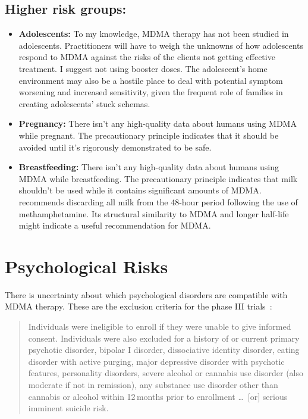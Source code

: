 \documentclass[11pt,oneside]{book}
\let\cite\parencite
\begin{document}
\subsection*{Higher risk groups:}
\begin{itemize}
    \item \textbf{Adolescents:} To my knowledge, MDMA therapy has not been studied in adolescents. Practitioners will have to weigh the unknowns of how adolescents respond to MDMA against the risks of the clients not getting effective treatment. I suggest not using booster doses. The adolescent's home environment may also be a hostile place to deal with potential symptom worsening and increased sensitivity, given the frequent role of families in creating adolescents' stuck schemas.
    \item \textbf{Pregnancy:} There isn't any high-quality data about humans using MDMA while pregnant. The precautionary principle indicates that it should be avoided until it's rigorously demonstrated to be safe.
    \item \textbf{Breastfeeding:} There isn't any high-quality data about humans using MDMA while breastfeeding. The precautionary principle indicates that milk shouldn't be used while it contains significant amounts of MDMA. \textcite{bartuLactation} recommends discarding all milk from the 48-hour period following the use of methamphetamine. Its structural similarity to MDMA and longer half-life might indicate a useful recommendation for MDMA.
\end{itemize}

\section{Psychological Risks}
\label{psychologicalRisks}
There is uncertainty about which psychological disorders are compatible with MDMA therapy. These are the exclusion criteria for the phase III trials~\cite[Supplementary Information; p. 5]{mitchellMDMAClinicalTrial2}:
\begin{quotation}
    Individuals were ineligible to enroll if they were unable to give informed consent. Individuals were also excluded for a history of or current primary psychotic disorder, bipolar I disorder, dissociative identity disorder, eating disorder with active purging, major depressive disorder with psychotic features, personality disorders, severe alcohol or cannabis use disorder (also moderate if not in remission), any substance use disorder other than cannabis or alcohol within 12\,months prior to enrollment \dots\ [or] serious imminent suicide risk.
\end{quotation}
\end{document}
